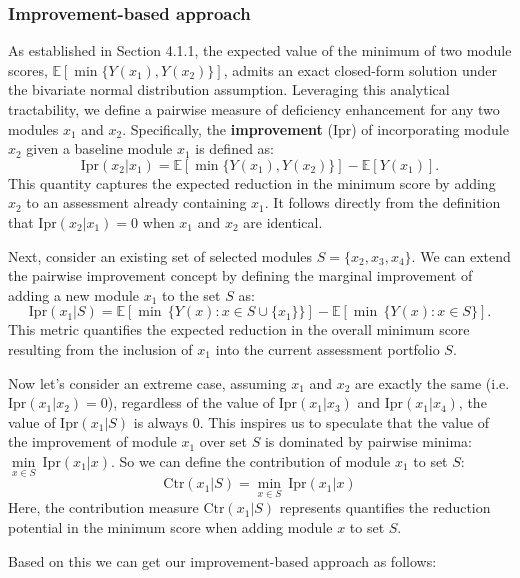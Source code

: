 \documentclass[opre,sglanonrev]{informs4}
\begin{document}
\subsubsection{Improvement-based approach}
As established in Section 4.1.1, the expected value of the minimum of two module scores, $\mathbb{E}[\min\{Y(x_1), Y(x_2)\}]$, admits an exact closed-form solution under the bivariate normal distribution assumption. Leveraging this analytical tractability, we define a pairwise measure of deficiency enhancement for any two modules $x_1$ and $x_2$. Specifically, the \textbf{improvement} (Ipr) of incorporating module $x_2$ given a baseline module $x_1$ is defined as:
$$
\text{Ipr}(x_2 | x_1) = \mathbb{E}[\min\{Y(x_1), Y(x_2)\}] - \mathbb{E}[Y(x_1)].
$$
This quantity captures the expected reduction in the minimum score by adding $x_2$ to an assessment already containing $x_1$. It follows directly from the definition that $\text{Ipr}(x_2 | x_1) = 0$ when $x_1$ and $x_2$ are identical.

Next, consider an existing set of selected modules $S = \{x_2, x_3, x_4\}$. We can extend the pairwise improvement concept by defining the marginal improvement of adding a new module $x_1$ to the set $S$ as:
$$
\text{Ipr}(x_1 | S) = \mathbb{E}\left[\min\,\{Y(x) : x \in S \cup \{x_1\}\}\right] - \mathbb{E}\left[\min\,\{Y(x) : x \in S\}\right].
$$
This metric quantifies the expected reduction in the overall minimum score resulting from the inclusion of $x_1$ into the current assessment portfolio $S$.

Now let's consider an extreme case, assuming $x_1$ and $x_2$ are exactly the same (i.e. $\text{Ipr}(x_1|x_2)=0$), regardless of the value of $\text{Ipr}(x_1|x_3)$ and $\text{Ipr}(x_1|x_4)$, the value of $\text{Ipr}(x_1|S)$ is always $0$. This inspires us to speculate that the value of the improvement of module $x_1$ over set $S$ is dominated by pairwise minima: $\underset{x\in S}{{\min}}~\text{Ipr}(x_1|x)$. So we can define the contribution of module $x_1$ to set $S$: 
$$
\text{Ctr}(x_1|S) = \underset{x\in S}{{\min}}~\text{Ipr}(x_1|x)
$$
Here, the contribution measure $\text{Ctr}(x_1|S)$ represents quantifies the reduction potential in the minimum score when adding module $x$ to set $S$.

Based on this we can get our improvement-based approach as follows:
\end{document}
